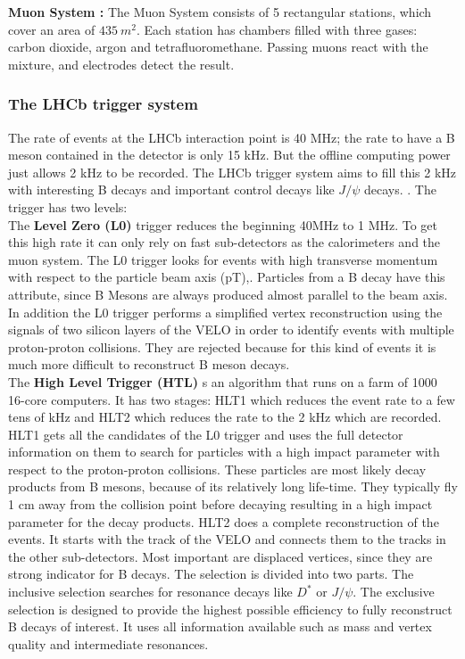 \documentclass[english]{uzhpub}
\begin{document}
\textbf{Muon System \cite{bib:muonSys} :} The Muon System consists of 5 rectangular stations, which cover an area of $\SI{435}{m^2}$.  Each station has chambers filled with three gases: carbon dioxide, argon and tetrafluoromethane. Passing muons react with the mixture, and electrodes detect the result.


\subsubsection{The LHCb trigger system}
The rate of events at the LHCb interaction point is 40 MHz;  the rate to have a B meson contained in the detector is only 15 kHz. But the offline computing power just allows 2 kHz to be recorded. The LHCb trigger system aims to fill this 2 kHz with interesting B decays and important control decays like $J/\psi$ decays.  \cite{bib:JPsi}. The trigger has two levels: \\
The \textbf{Level Zero (L0)} trigger reduces the beginning 40MHz to 1 MHz. To get this high rate it can only rely on fast sub-detectors as the calorimeters and the muon system. The L0 trigger looks for events with high transverse momentum with respect to the particle beam axis (pT),. Particles from a B decay have this attribute, since B Mesons are always produced almost parallel to the beam axis.
In addition the L0 trigger performs a simplified vertex reconstruction using the signals of two silicon layers of the VELO in order to identify events with multiple proton-proton collisions. They are rejected because for this kind of events it is much more difficult to reconstruct B meson decays.  \\
The \textbf{High Level Trigger (HTL)} s an algorithm that runs on a farm of 1000 16-core computers. It has two stages: HLT1 which reduces the event rate to a few tens of kHz and HLT2 which reduces the rate to the 2 kHz which are recorded. HLT1 gets all the candidates of the L0 trigger and uses the full detector information on them to search for particles with a high impact parameter with respect to the proton-proton collisions. These particles are most likely decay products from B mesons, because of its relatively long life-time. They typically fly 1 cm away from the collision point before decaying resulting in a high impact parameter for the decay products. HLT2 does a complete reconstruction of the events. It starts with the track of the VELO and connects them to the tracks in the other sub-detectors. Most important are displaced vertices, since they are strong indicator for B decays. The selection is divided into two parts. The inclusive selection searches for resonance decays like $D^*$ or $J/\psi$. The exclusive selection is designed to provide the highest possible efficiency to fully reconstruct B decays of interest. It uses all information available such as mass and vertex quality and intermediate resonances.
\end{document}
